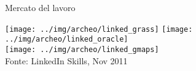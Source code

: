 \documentclass[xcolor=svgnames]{beamer}
\begin{document}

		\begin{frame}{Mercato del lavoro}
			\begin{center}
				\texttt{[image: ../img/archeo/linked\_grass]}
				\hfill
				\texttt{[image: ../img/archeo/linked\_oracle]}\\
				\texttt{[image: ../img/archeo/linked\_gmaps]}\\
				Fonte: LinkedIn Skills, Nov 2011
			\end{center}
		\end{frame}

\end{document}

